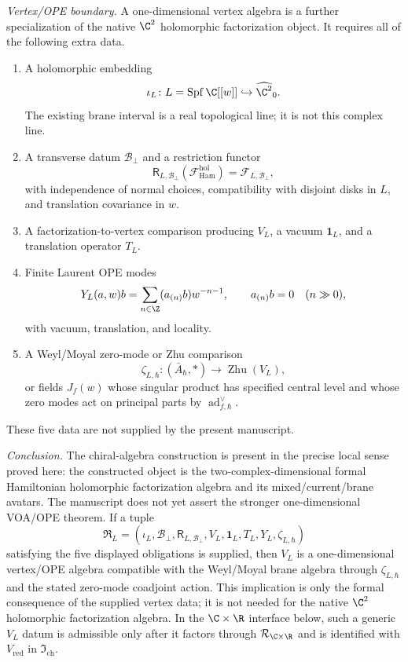 \begin{stmt}
  \emph{Vertex/OPE boundary.} A one-dimensional vertex algebra is a
  further specialization of the native \(\C^2\) holomorphic factorization
  object.  It requires all of the following extra data.
  \begin{enumerate}[label=(\arabic*)]
    \item A holomorphic embedding
      \[
        \iota_L\colon L=\operatorname{Spf}\C[[w]]
        \hookrightarrow\widehat{\C^2}_0 .
      \]
      The existing brane interval is a real topological line; it is not
      this complex line.
    \item A transverse datum \(\mathcal B_\perp\) and a restriction
      functor
      \[
        \mathsf R_{L,\mathcal B_\perp}(\mathcal F_{\mathrm{Ham}}^{\mathrm{hol}})
        =
        \mathcal F_{L,\mathcal B_\perp},
      \]
      with independence of normal choices, compatibility with disjoint
      disks in \(L\), and translation covariance in \(w\).
    \item A factorization-to-vertex comparison producing
      \(V_L\), a vacuum \(\mathbf 1_L\), and a translation operator
      \(T_L\).
    \item Finite Laurent OPE modes
      \[
        Y_L(a,w)b=\sum_{n\in\Z}(a_{(n)}b)w^{-n-1},\qquad
        a_{(n)}b=0\quad(n\gg0),
      \]
      with vacuum, translation, and locality.
    \item A Weyl/Moyal zero-mode or Zhu comparison
      \[
        \zeta_{L,\hbar}\colon
        (\bar A_\hbar,*)\longrightarrow \operatorname{Zhu}(V_L),
      \]
      or fields \(J_f(w)\) whose singular product has specified central
      level and whose zero modes act on principal parts by
      \(\operatorname{ad}^{\vee}_{f,\hbar}\).
  \end{enumerate}
  These five data are not supplied by the present manuscript.

  \emph{Conclusion.} The chiral-algebra construction is present in the
  precise local sense proved here: the constructed object is the
  two-complex-dimensional formal Hamiltonian holomorphic
  factorization algebra and its mixed/current/brane avatars.  The
  manuscript does not yet assert the stronger one-dimensional VOA/OPE
  theorem.  If a tuple
  \[
    \mathfrak R_L
    =
    (\iota_L,\mathcal B_\perp,\mathsf R_{L,\mathcal B_\perp},
    V_L,\mathbf 1_L,T_L,Y_L,\zeta_{L,\hbar})
  \]
  satisfying the five displayed obligations is supplied, then \(V_L\)
  is a one-dimensional vertex/OPE algebra compatible with the Weyl/Moyal
  brane algebra through \(\zeta_{L,\hbar}\) and the stated zero-mode
  coadjoint action.  This implication is only the formal consequence of
  the supplied vertex data; it is not needed for the native \(\C^2\)
  holomorphic factorization algebra.  In the \(\C\times\R\) interface below,
  such a generic \(V_L\) datum is admissible only after it factors through
  \(\mathcal R_{\C\times\R}\) and is identified with
  \(V_{\mathrm{red}}\) in \(\mathfrak I_{\mathrm{ch}}\).
\end{stmt}

